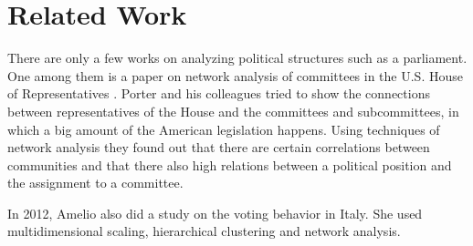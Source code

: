 \chapter{Related Work}
\label{chap:relatedwork}

There are only a few works on analyzing political structures such as a parliament. One among them is a paper on network analysis of committees in the U.S. House of Representatives \cite{Porter_2005}. Porter and his colleagues tried to show the connections between representatives of the House and the committees and subcommittees, in which a big amount of the American legislation happens. Using techniques of network analysis they found out that there are certain correlations between communities and that there also high relations between a political position and the assignment to a committee. 

In 2012, Amelio \cite{Amelio_2012} also did a study on the voting behavior in Italy. She used multidimensional scaling, hierarchical clustering and network analysis.




